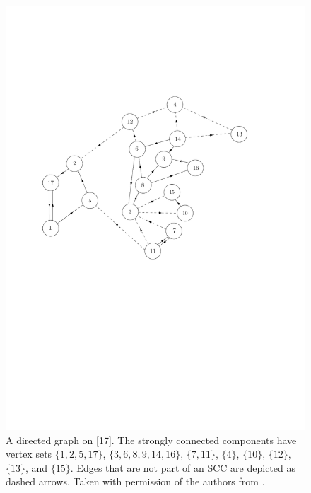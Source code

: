 \begin{figure}
    \centering
    \includegraphics[scale=0.6]{Content/Pictures/biggraph.pdf}
    \caption{A directed graph on [17]. The strongly connected components have vertex sets $\{1,2,5,17\}$, $\{3,6,8,9,14,16\}$, $\{7,11\}$, $\{4\}$, $\{10\}$, $\{12\}$, $\{13\}$, and $\{15\}$. Edges that are not part of an SCC are depicted as dashed arrows. Taken with permission of the authors from \cite{goldschmidtScalingLimitCritical2019}.}
    \label{fig.SCCs}
\end{figure}


